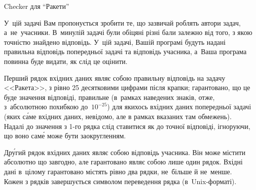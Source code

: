 
\makeTableLongfalse

\begin{problemAllDefault}{Checker для ``Ракети''}

У~цій задачі Вам пропонується зробити те, що зазвичай роблять автори задач, а~не~учасники.
В~минулій задачі були обіцяні різні бали залежно від того, з якою точністю знайдено відповідь.
У~цій задачі, Вашій програмі будуть надані правильна відповідь попередньої задачі та відповідь учасника, а~Ваша програма повинна буде видати, як слід це оцінити.

\InputFile
Перший рядок вхідних даних являє собою правильну відповідь на задачу <<Ракета>>, з рівно 25 десятковими цифрами після крапки; гарантовано, що це буде значення відповіді, правильне (в~рамках наведених знаків, отже, з~абсолютною похибкою до~$10^{-25}$) для якихось вхідних даних попередньої задачі (яких с\'{а}ме вхідних даних, невідомо, але в рамках вказаних там обмежень). Надалі до значення з \mbox{1-го} рядка слід ставитися як до точної відповіді, ігноруючи, що воно сам\'{е} може бути заокругленням.

Др\'{у}гий рядок вхідних даних являє собою відповідь учасника. Він може містити абсолютно що завгодно, але гарантовано являє собою лише один рядок. Вхідні дані в~цілому гарантовано містять рівно два рядки, не~більше й не~менше. Кожен з рядків завершується символом переведення рядка (в~Unix-форматі).



\end{problemAllDefault}
